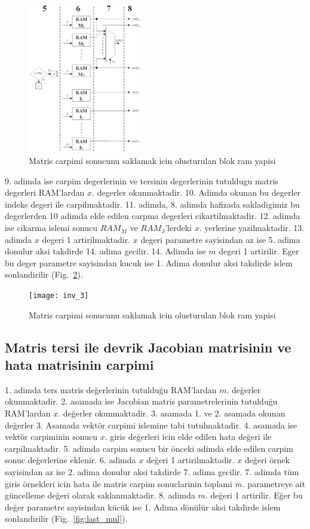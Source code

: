 \documentclass[]{interact}
\theoremstyle{plain}%
\theoremstyle{definition}
\theoremstyle{remark}
\begin{document}
\begin{figure}[h]
  \centering
  \includegraphics[width=5cm]{inv_2}

  \caption{Matris carpimi sonucunu saklamak icin olusturulan blok ram yapisi}
  \label{fig:inv_2}
\end{figure}

9. adimda ise carpim degerlerinin ve tersinin degerlerinin tutuldugu matris degerleri RAM’lardan $x.$ degerler okunmaktadir. 10. Adimda okunan bu degerler indeks degeri ile carpilmaktadir. 11. adimda, 8. adimda hafizada sakladigimiz bu degerlerden 10 adimda elde edilen carpma degerleri cikartilmaktadir. 12. adimda ise cikarma islemi sonucu $RAM_M$ ve $RAM_J$’lerdeki $x.$ yerlerine yazilmaktadir. 13. adimda $x$  degeri 1 artirilmaktadir.  $x$ degeri parametre sayisindan az ise 5. adima donulur aksi takdirde 14. adima gecilir. 14. Adimda ise $m$ degeri 1 artirilir. Eger bu deger parametre sayisindan kucuk ise 1. Adima donulur aksi takdirde islem sonlandirilir (Fig.~\ref{fig:inv_3}).

\begin{figure}[h]
  \centering
  \texttt{[image: inv\_3]}

  \caption{Matris carpimi sonucunu saklamak icin olusturulan blok ram yapisi}
  \label{fig:inv_3}
\end{figure}

\subsection{Matris tersi ile devrik Jacobian matrisinin ve hata matrisinin carpimi}
1. adimda ters matris değerlerinin tutulduğu RAM’lardan $m.$  değerler okunmaktadir. 2. asamada ise Jacobian matris parametrelerinin tutulduğu RAM’lardan $x.$  değerler okunmaktadir. 3. asamada 1. ve 2. asamada okunan değerler 3. Asamada vektör carpimi islemine tabi tutulmaktadir. 4. asamada ise vektör carpiminin sonucu $x.$ giris  değerleri icin elde edilen hata değeri ile carpilmaktadir.  5. adimda carpim sonucu bir önceki adimda elde edilen carpim sonuc değerlerine eklenir. 6. adimda $x$  değeri 1 artirilmaktadir. $x$  değeri örnek sayisindan az ise 2. adima donulur aksi takdirde 7. adima gecilir. 7. adimda tüm giris örnekleri icin hata ile matris carpim sonuclarinin toplami $m.$ parametreye ait güncelleme değeri olarak saklanmaktadir. 8. adimda $m.$ değeri 1 artirilir. Eğer bu değer parametre sayisindan kücük ise 1. Adima dönülür aksi takdirde islem sonlandirilir (Fig.~\ref{fig:last_mul}).
\end{document}
